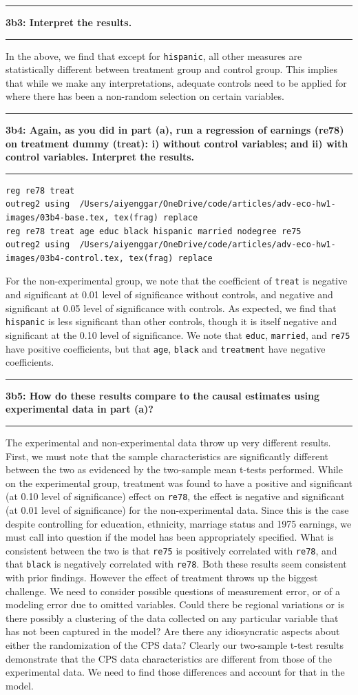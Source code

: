 \documentclass[12pt]{article}
\newcommand\question[2]{\vspace{1em}\hrule\vspace{1em}\textbf{#1: #2}\vspace{1em}\hrule\vspace{1em}}
\begin{document}
\question{3b3}{ Interpret the results.  }
In the above, we find that except for \verb|hispanic|, all other measures are statistically different between treatment group and control group. This implies that while we make any interpretations, adequate controls need to be applied for where there has been a non-random selection on certain variables.
\question{3b4}{ Again, as you did in part (a), run a regression of earnings (re78) on treatment dummy (treat): i) without control variables; and ii) with control variables.  Interpret the results.  }
\begin{lstlisting}
reg re78 treat
outreg2 using  /Users/aiyenggar/OneDrive/code/articles/adv-eco-hw1-images/03b4-base.tex, tex(frag) replace
reg re78 treat age educ black hispanic married nodegree re75
outreg2 using  /Users/aiyenggar/OneDrive/code/articles/adv-eco-hw1-images/03b4-control.tex, tex(frag) replace
\end{lstlisting}



For the non-experimental group, we note that the coefficient of \verb|treat| is negative and significant at 0.01 level of significance without controls, and negative and significant at 0.05 level of significance with controls. As expected, we find that \verb|hispanic| is less significant than other controls, though it is itself negative and significant at the 0.10 level of significance. We note that \verb|educ|, \verb|married|, and \verb|re75| have positive coefficients, but that \verb|age|, \verb|black| and \verb|treatment| have negative coefficients.
\question{3b5}{ How do these results compare to the causal estimates using experimental data in part (a)? }
The experimental and non-experimental data throw up very different results. First, we must note that the sample characteristics are significantly different between the two as evidenced by the two-sample mean t-tests performed. While on the experimental group, treatment was found to have a positive and significant (at 0.10 level of significance) effect on \verb|re78|, the effect is negative and significant (at 0.01 level of significance) for the non-experimental data. Since this is the case despite controlling for education, ethnicity, marriage status and 1975 earnings, we must call into question if the model has been appropriately specified. What is consistent between the two is that \verb|re75| is positively correlated with \verb|re78|, and that \verb|black| is negatively correlated with \verb|re78|. Both these results seem consistent with prior findings. However the effect of treatment throws up the biggest challenge. We need to consider possible questions of measurement error, or of a modeling error due to omitted variables. Could there be regional variations or is there possibly a clustering of the data collected on any particular variable that has not been captured in the model? Are there any idiosyncratic aspects about either the randomization of the CPS data? Clearly our two-sample t-test results demonstrate that the CPS data characteristics are different from those of the experimental data. We need to find those differences and account for that in the model. 


 

\end{document}
